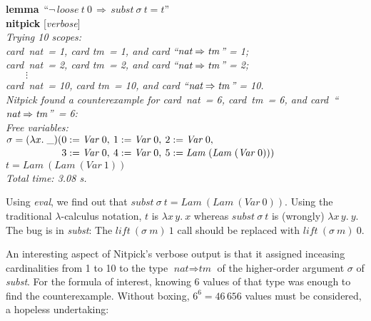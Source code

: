 \documentclass[a4paper,12pt]{article}
\def\unk{{\_}}
\def\unkef{(\lambda x.\; \unk)}
\renewcommand\_{\hbox{\textunderscore\kern-.05ex}}
\begin{document}
\pre
\textbf{lemma}~``$\lnot\,\textit{loose}~t~0 \,\Longrightarrow\, \textit{subst}~\sigma~t = t$'' \\
\textbf{nitpick} [\textit{verbose}] \\[2\smallskipamount]
\slshape
Trying 10 scopes: \nopagebreak \\
\hbox{}\qquad \textit{card~nat}~= 1, \textit{card tm}~= 1, and \textit{card} ``$\textit{nat} \Rightarrow \textit{tm\/}$'' = 1; \\
\hbox{}\qquad \textit{card~nat}~= 2, \textit{card tm}~= 2, and \textit{card} ``$\textit{nat} \Rightarrow \textit{tm\/}$'' = 2; \\
\hbox{}\qquad $\qquad\vdots$ \\[.5\smallskipamount]
\hbox{}\qquad \textit{card~nat}~= 10, \textit{card tm}~= 10, and \textit{card} ``$\textit{nat} \Rightarrow \textit{tm\/}$'' = 10. \\[2\smallskipamount]
Nitpick found a counterexample for \textit{card~nat}~= 6, \textit{card~tm}~= 6,
and \textit{card}~``$\textit{nat} \Rightarrow \textit{tm\/}$''~= 6: \\[2\smallskipamount]
\hbox{}\qquad Free variables: \nopagebreak \\
\hbox{}\qquad\qquad $\sigma = \unkef(\!\begin{aligned}[t]
& 0 := \textit{Var}~0,\>
  1 := \textit{Var}~0,\>
  2 := \textit{Var}~0, \\[-2pt]
& 3 := \textit{Var}~0,\>
  4 := \textit{Var}~0,\>
  5 := \textit{Lam}~(\textit{Lam}~(\textit{Var}~0)))\end{aligned}$ \\
\hbox{}\qquad\qquad $t = \textit{Lam}~(\textit{Lam}~(\textit{Var}~1))$ \\[2\smallskipamount]
Total time: 3.08 s.
\postw

Using \textit{eval}, we find out that $\textit{subst}~\sigma~t =
\textit{Lam}~(\textit{Lam}~(\textit{Var}~0))$. Using the traditional
$\lambda$-calculus notation, $t$ is
$\lambda x\, y.\> x$ whereas $\textit{subst}~\sigma~t$ is (wrongly) $\lambda x\, y.\> y$.
The bug is in \textit{subst\/}: The $\textit{lift}~(\sigma~m)~1$ call should be
replaced with $\textit{lift}~(\sigma~m)~0$.

An interesting aspect of Nitpick's verbose output is that it assigned inceasing
cardinalities from 1 to 10 to the type $\textit{nat} \Rightarrow \textit{tm}$
of the higher-order argument $\sigma$ of \textit{subst}.
For the formula of interest, knowing 6 values of that type was enough to find
the counterexample. Without boxing, $6^6 = 46\,656$ values must be
considered, a hopeless undertaking:
\end{document}

